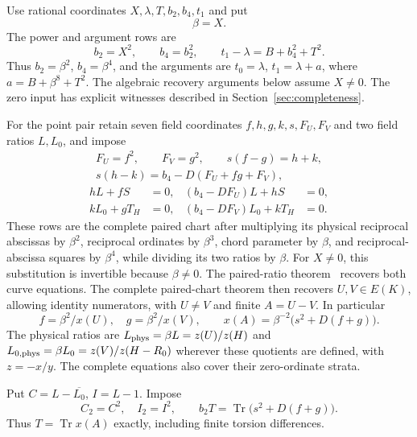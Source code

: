 \documentclass[11pt,a4paper]{article}
\DeclareMathOperator{\Tr}{Tr}\DeclareMathOperator{\Nm}{Nm}
\begin{document}
Use rational coordinates $X,\lambda,T,b_2,b_4,t_1$ and put
\[
                              \beta=X.
\]
The power and argument rows are
\begin{equation}\label{eq:powers}
 b_2=X^2,\qquad b_4=b_2^2,\qquad
 t_1-\lambda=B+b_4^2+T^2.
\end{equation}
Thus $b_2=\beta^2$, $b_4=\beta^4$, and the arguments are
$t_0=\lambda$, $t_1=\lambda+a$, where $a=B+\beta^8+T^2$.
The algebraic recovery arguments below assume $X\ne0$.
The zero input has explicit witnesses described in
Section~\ref{sec:completeness}.

For the point pair retain seven field coordinates
$f,h,g,k,s,F_U,F_V$ and two field ratios $L,L_0$, and impose
\begin{equation}\label{eq:pair}
 \begin{gathered}
 F_U=f^2,\qquad F_V=g^2,\qquad s(f-g)=h+k,\\
 s(h-k)=b_4-D(F_U+fg+F_V),
 \end{gathered}
\end{equation}
\begin{equation}\label{eq:ratios}
 \begin{aligned}
 hL+fS&=0,&(b_4-DF_U)L+hS&=0,\\
 kL_0+gT_H&=0,&(b_4-DF_V)L_0+kT_H&=0.
 \end{aligned}
\end{equation}
These rows are the complete paired chart after multiplying its
physical reciprocal abscissas by $\beta^2$, reciprocal ordinates by
$\beta^3$, chord parameter by $\beta$, and reciprocal-abscissa squares
by $\beta^4$, while dividing its two ratios by $\beta$.
For $X\ne0$, this substitution is invertible because $\beta\ne0$.
The paired-ratio theorem~\cite[Theorem~1.1]{Pair} recovers both
curve equations. The complete paired-chart theorem
\cite[Proposition~2.1]{Trace} then recovers
$U,V\in E(K)$, allowing identity numerators, with $U\ne V$ and
finite $A=U-V$. In particular
\[
 f=\beta^2/x(U),\quad g=\beta^2/x(V),\qquad
 x(A)=\beta^{-2}\bigl(s^2+D(f+g)\bigr).
\]
The physical ratios are
$L_{\rm phys}=\beta L=z(U)/z(H)$ and
$L_{0,\rm phys}=\beta L_0=z(V)/z(H-R_0)$ wherever these quotients are
defined, with $z=-x/y$. The complete equations also cover their
zero-ordinate strata.

Put $C=L-\overline{L_0}$, $I=L-1$. Impose
\begin{equation}\label{eq:common}
 C_2=C^2,\quad I_2=I^2,\qquad
                    b_2T=\Tr\bigl(s^2+D(f+g)\bigr).
\end{equation}
Thus $T=\Tr x(A)$ exactly, including finite torsion differences.
\end{document}
